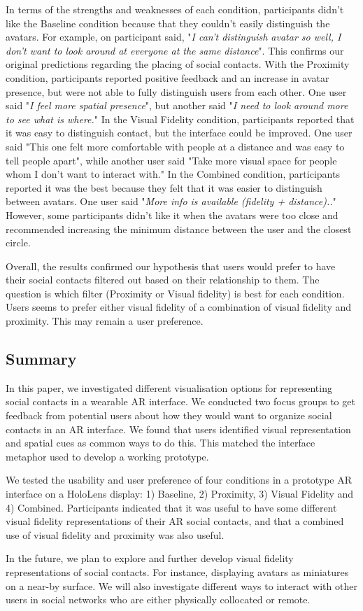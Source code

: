 In terms of the strengths and weaknesses of each condition, participants didn't like the Baseline condition because that they couldn't easily distinguish the avatars. For example, on participant said, "\textit{I can't distinguish avatar so well, I don't want to look around at everyone at the same distance}". This confirms our original predictions regarding the placing of social contacts.
With the Proximity condition, participants reported positive feedback and an increase in avatar presence, but were not able to fully distinguish users from each other.  One user said "\textit{I feel more spatial presence}", but another said "\textit{I need to look around more to see what is where.}"
In the Visual Fidelity condition, participants reported that it was easy to distinguish contact, but the interface could be improved. One user said "This one felt more comfortable with people at a distance and was easy to tell people apart", while another user said "Take more visual space for people whom I don't want to interact with."
In the Combined condition, participants reported it was the best because they felt that it was easier to distinguish between avatars. One user said "\textit{More info is available (fidelity + distance)..}"
However, some participants didn't like it when the avatars were too close and recommended increasing the minimum distance between the user and the closest circle.

Overall, the results confirmed our hypothesis that users would prefer to have their social contacts filtered out based on their relationship to them. The question is which filter (Proximity or Visual fidelity) is best for each condition. Users seems to prefer either visual fidelity of a combination of visual fidelity and proximity. This may remain a user preference. 

\subsection{Summary}

In this paper, we investigated different visualisation options for representing social contacts in a wearable AR interface. We conducted two focus groups to get feedback from potential users about how they would want to organize social contacts in an AR interface. We found that users identified visual representation and spatial cues as common ways to do this. This matched the interface metaphor used to develop a working prototype.

We tested the usability and user preference of four conditions in a prototype AR interface on a HoloLens display: 1) Baseline, 2) Proximity, 3) Visual Fidelity and 4) Combined. Participants indicated that it was useful to have some different visual fidelity representations of their AR social contacts, and that a combined use of visual fidelity and proximity was also useful.

In the future, we plan to explore and further develop visual fidelity representations of social contacts. For instance, displaying avatars as miniatures on a near-by surface. We will also investigate different ways to interact with other users in social networks who are either physically collocated or remote.
